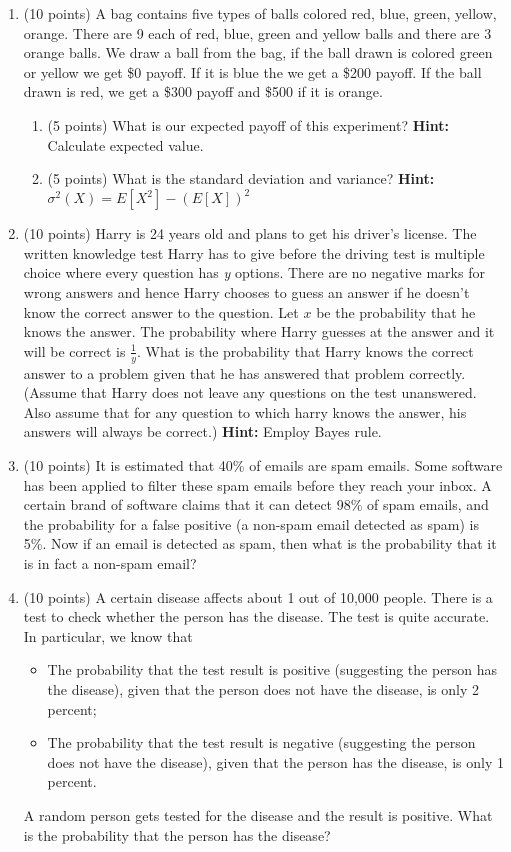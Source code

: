 \documentclass{article}%
\begin{document}
\begin{enumerate}
    \item (10 points) A bag contains five types of balls colored red, blue, green, yellow, orange. There are 9 each of red, blue, green and yellow balls and there are 3 orange balls. We draw a ball from the bag, if the ball drawn is colored green or yellow we get \$0 payoff. If it is blue the we get a \$200 payoff. If the ball drawn is red, we get a \$300 payoff and \$500 if it is orange.
    \begin{enumerate}
        \item (5 points) What is our expected payoff of this experiment? \textbf{Hint:} Calculate expected value.
        \item (5 points) What is the standard deviation and variance? \textbf{Hint:} $\sigma^2(X) = E[X^2] - (E[X])^2$
    \end{enumerate}
    \item (10 points) Harry is 24 years old and plans to get his driver's license. The written knowledge test Harry has to give before the driving test is multiple choice where every question has \emph{y} options. There are no negative marks for wrong answers and hence Harry chooses to guess an answer if he doesn't know the correct answer to the question. Let $x$ be the probability that he knows the answer. The probability where Harry guesses at the answer and it will be correct is $\frac{1}{y}$. What is the probability that Harry knows the correct answer to a problem given that he has answered that problem correctly.
    (Assume that Harry does not leave any questions on the test unanswered. Also assume that for any question to which harry knows the answer, his answers will always be correct.) \textbf{Hint:} Employ Bayes rule.
    \item (10 points) It is estimated that 40\% of emails are spam emails. Some software has been applied to filter these spam emails before they reach your inbox. A certain brand of software claims that it can detect 98\% of spam emails, and the probability for a false positive (a non-spam email detected as spam) is 5\%. Now if an email is detected as spam, then what is the probability that it is in fact a non-spam email?
 
    \item (10 points) A  certain  disease  affects  about 1 out  of 10,000  people.  There  is  a  test  to  check whether the person has the disease. The test is quite accurate. In particular, we know that

    \begin{itemize}
        \item The probability that the test result is positive  (suggesting the person has the disease), given that the person does not have the disease, is only 2 percent; 
        \item The probability that the test result is negative (suggesting the person does not have the disease), given that the person has the disease, is only 1 percent. 
    \end{itemize}

    A random person gets tested for the disease and the result is positive. What is the probability that the person has the disease?
\end{enumerate}
\end{document}
